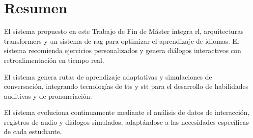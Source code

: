 \chapter*{Resumen}
\label{resumen}


El sistema propuesto en este Trabajo de Fin de Máster integra \gls{rl}, arquitecturas \gls{transformers} y un sistema de \gls{rag} para optimizar el aprendizaje de idiomas. El sistema recomienda ejercicios personalizados y genera diálogos interactivos con retroalimentación en tiempo real.

El sistema genera rutas de aprendizaje adaptativas y simulaciones de conversación, integrando tecnologías de \gls{tts} y \gls{stt} para el desarrollo de habilidades auditivas y de pronunciación.

El sistema evoluciona continuamente mediante el análisis de datos de interacción, registros de audio y diálogos simulados, adaptándose a las necesidades específicas de cada estudiante.